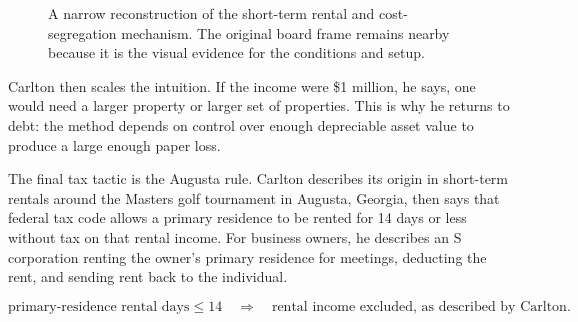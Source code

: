 \begin{figure}
\centering
{}
\caption{A narrow reconstruction of the short-term rental and cost-segregation mechanism. The original board frame remains nearby because it is the visual evidence for the conditions and setup.}
\label{fig:str-flow}
\end{figure}

Carlton then scales the intuition. If the income were \$1 million, he says, one would need a larger property or larger set of properties. This is why he returns to debt: the method depends on control over enough depreciable asset value to produce a large enough paper loss.

The final tax tactic is the Augusta rule. Carlton describes its origin in short-term rentals around the Masters golf tournament in Augusta, Georgia, then says that federal tax code allows a primary residence to be rented for 14 days or less without tax on that rental income. For business owners, he describes an S corporation renting the owner's primary residence for meetings, deducting the rent, and sending rent back to the individual.

\begin{equation}
\text{primary-residence rental days}\leq 14
\quad\Longrightarrow\quad
\text{rental income excluded, as described by Carlton}.
\end{equation}

